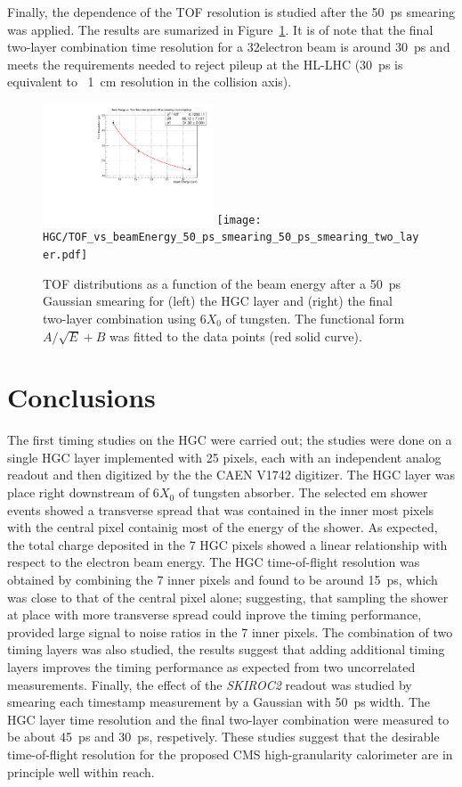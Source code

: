 Finally, the dependence of the TOF resolution is studied after the
50~ps smearing was applied. The results are sumarized in
Figure~\ref{hgc:TOF_vs_beamEnergy_Smeared}.
It is of note that the final
two-layer combination time
resolution for a 32\GeV electron beam is around 30~ps and meets the
requirements needed to reject pileup at the HL-LHC (30~ps is
equivalent to ~1~cm resolution in the collision axis).
\begin{figure}[h] 
\centering
\includegraphics[width=0.45\textwidth]{HGC/TOF_vs_beamEnergy_50_ps_smearing.pdf} 
\texttt{[image: HGC/TOF\_vs\_beamEnergy\_50\_ps\_smearing\_50\_ps\_smearing\_two\_layer.pdf]} 
\caption{TOF distributions as a function of the beam energy after a 50~ps Gaussian smearing for (left)
  the HGC layer and (right) the final two-layer combination using 6$X_{0}$ of tungsten. The functional form $A/\sqrt{E} +
B$ was fitted to the data points (red solid curve).} 
\label{hgc:TOF_vs_beamEnergy_Smeared} 
\end{figure}
\section{Conclusions}\label{hgc:conclusion}
The first timing studies on the HGC were carried out; the studies were
done on a single HGC layer implemented with 25 pixels, each with an
independent analog readout and then digitized by the the CAEN
V1742 digitizer. The HGC layer was place right downstream of 6$X_{0}$
of tungsten absorber. The selected em shower events showed a
transverse spread that was contained in the inner most pixels with the
central pixel containig most of the energy of the shower. As expected,
the total
charge deposited in the 7 HGC pixels showed a linear relationship with
respect to the electron beam energy. The HGC time-of-flight resolution
was obtained by combining the 7 inner pixels and found to be around
15~ps, which was close to that of the central pixel alone; suggesting,
that sampling the shower at place with more transverse spread could
inprove the timing performance, provided large signal to noise ratios in
the 7 inner pixels. The combination of two timing layers was also
studied, the results suggest that adding additional timing layers
improves the timing performance as expected from two uncorrelated
measurements. Finally, the effect of the \textit{SKIROC2} readout was
studied by smearing each timestamp measurement by a Gaussian with
50~ps width. The HGC layer time resolution and the final two-layer
combination were measured to be about
45~ps and 30~ps, respetively. These studies suggest that the desirable
time-of-flight resolution for the proposed CMS high-granularity
calorimeter are in principle well within reach. 
